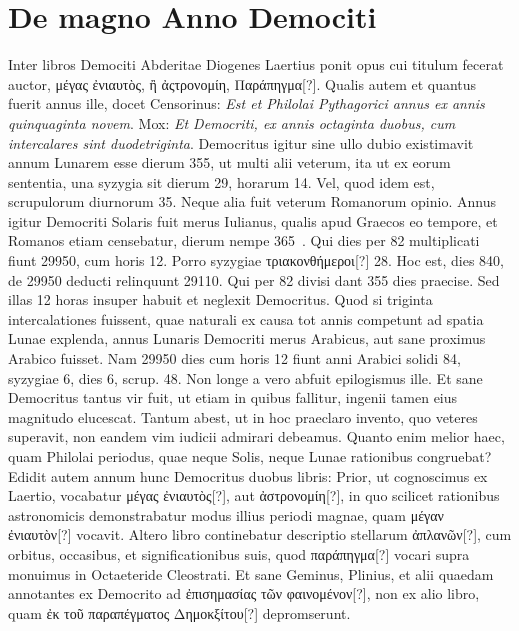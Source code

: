 \section{De magno Anno Demociti}
%
Inter libros Demociti Abderitae Diogenes Laertius ponit opus
cui titulum fecerat auctor,
 \textgreek{μέγας ἐνιαυτὸς, ἢ ἀςτρονομίη, Παράπηγμα[?]}.
Qualis autem et quantus fuerit annus ille, docet Censorinus:
\textit{Est et Philolai Pythagorici annus ex annis quinquaginta novem}.
Mox:
 \textit{Et Democriti, ex annis octaginta
  duobus, cum intercalares sint
duodetriginta}.
Democritus igitur sine ullo dubio existimavit annum
Lunarem esse dierum 355, ut multi alii veterum, ita ut ex eorum
sententia, una syzygia sit dierum 29, horarum 14. %
Vel, quod idem
est, scrupulorum diurnorum 35.
Neque alia fuit veterum Romanorum
opinio.
Annus igitur Democriti Solaris fuit merus Iulianus,
qualis apud Graecos eo tempore, et Romanos etiam censebatur, dierum
nempe 365~.
Qui dies per 82 multiplicati fiunt 29950, cum
horis 12.
Porro syzygiae \textgreek{τριακονθήμεροι[?]} 28. %
Hoc est, dies 840, de
29950 deducti relinquunt 29110.
Qui per 82 divisi dant 355 dies
praecise.
Sed illas 12 horas insuper habuit et neglexit Democritus.
Quod si triginta intercalationes fuissent, quae naturali ex causa tot
annis competunt ad spatia Lunae explenda, annus Lunaris Democriti
merus Arabicus, aut sane proximus Arabico fuisset.
Nam 29950
dies cum horis 12 fiunt anni Arabici solidi 84, syzygiae 6, dies 6,
scrup. 48.
Non longe a vero abfuit epilogismus ille.
Et sane Democritus
tantus vir fuit, ut etiam in quibus fallitur, ingenii tamen eius
magnitudo elucescat.
Tantum abest, ut in hoc praeclaro invento,
quo veteres superavit, non eandem vim iudicii admirari debeamus.
Quanto enim melior haec, quam Philolai periodus, quae neque Solis,
neque Lunae rationibus congruebat?
Edidit autem annum
hunc Democritus duobus libris: Prior, ut cognoscimus ex Laertio,
vocabatur \textgreek{μέγας ἐνιαυτὸς[?]}, aut \textgreek{ἀστρονομίη[?]},
 in quo scilicet rationibus
astronomicis demonstrabatur modus illius periodi magnae,
quam \textgreek{μέγαν ἐνιαυτὸν[?]} vocavit.
Altero libro continebatur descriptio
stellarum \textgreek{ἀπλανῶν[?]}, cum orbitus, occasibus, et significationibus
suis, quod \textgreek{παράπηγμα[?]} vocari supra monuimus in
 Octaeteride Cleostrati.
%
Et sane Geminus, Plinius,
 et alii quaedam annotantes ex Democrito
ad \textgreek{ἐπισημασίας τῶν φαινομένον[?]}, non ex alio libro, quam
 \textgreek{ἐκ
τοῦ παραπέγματος Δημοκξίτου[?]} depromserunt.
%
